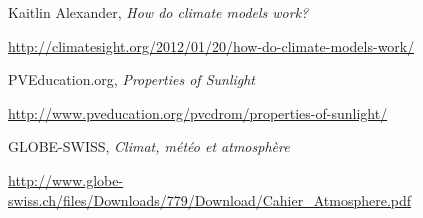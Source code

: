 \documentclass[12pt]{article}
\begin{document}
\begin{thebibliography}{9}

Kaitlin Alexander, \textit{How do climate models work?}

\url{http://climatesight.org/2012/01/20/how-do-climate-models-work/}


PVEducation.org, \textit{Properties of Sunlight}

\url{http://www.pveducation.org/pvcdrom/properties-of-sunlight/}


GLOBE-SWISS, \textit{Climat, météo et atmosphère}

\url{http://www.globe-swiss.ch/files/Downloads/779/Download/Cahier_Atmosphere.pdf}



\end{thebibliography}
\end{document}
